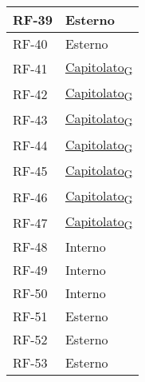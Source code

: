 \begin{longtable}{|>{\centering\arraybackslash}m{}|>{\centering\arraybackslash}m{}|}
	RF-39           & Esterno                                                                                                           \\\hline
	RF-40           & Esterno                                                                                                           \\\hline
	RF-41           & \href{https://7last.github.io/docs/rtb/documentazione-interna/glossario\#capitolato}{Capitolato\textsubscript{G}} \\\hline
	RF-42           & \href{https://7last.github.io/docs/rtb/documentazione-interna/glossario\#capitolato}{Capitolato\textsubscript{G}} \\\hline
	RF-43           & \href{https://7last.github.io/docs/rtb/documentazione-interna/glossario\#capitolato}{Capitolato\textsubscript{G}} \\\hline
	RF-44           & \href{https://7last.github.io/docs/rtb/documentazione-interna/glossario\#capitolato}{Capitolato\textsubscript{G}} \\\hline
	RF-45           & \href{https://7last.github.io/docs/rtb/documentazione-interna/glossario\#capitolato}{Capitolato\textsubscript{G}} \\\hline
	RF-46           & \href{https://7last.github.io/docs/rtb/documentazione-interna/glossario\#capitolato}{Capitolato\textsubscript{G}} \\\hline
	RF-47           & \href{https://7last.github.io/docs/rtb/documentazione-interna/glossario\#capitolato}{Capitolato\textsubscript{G}} \\\hline
	RF-48           & Interno                                                                                                           \\\hline
	RF-49           & Interno                                                                                                           \\\hline
	RF-50           & Interno                                                                                                           \\\hline
	RF-51           & Esterno                                                                                                           \\\hline
	RF-52           & Esterno                                                                                                           \\\hline
	RF-53           & Esterno                                                                                                           \\\hline

\end{longtable}
